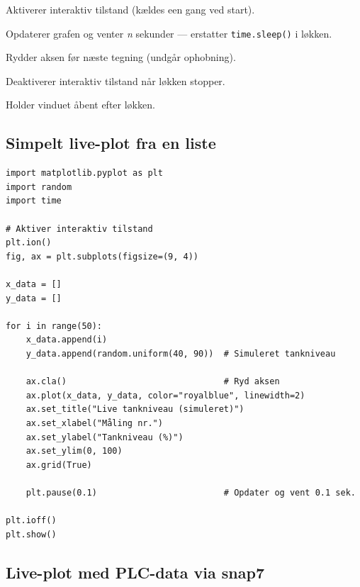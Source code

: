 \documentclass[12pt, a4paper]{article}
\begin{document}
\begin{tcolorbox}[infobox, title={\faInfoCircle\quad Hvordan virker \texttt{plt.ion()}?}]
\begin{description}[leftmargin=3.2cm, style=nextline]
  \item[\texttt{plt.ion()}]   Aktiverer interaktiv tilstand (kældes een gang ved start).
  \item[\texttt{plt.pause(n)}] Opdaterer grafen og venter \textit{n} sekunder ---
                               erstatter \texttt{time.sleep()} i løkken.
  \item[\texttt{ax.cla()}]    Rydder aksen før næste tegning (undgår ophobning).
  \item[\texttt{plt.ioff()}]  Deaktiverer interaktiv tilstand når løkken stopper.
  \item[\texttt{plt.show()}]  Holder vinduet åbent efter løkken.
\end{description}
\end{tcolorbox}

\subsection{Simpelt live-plot fra en liste}

\begin{tcolorbox}[pythonbox, title={\faPython\quad Kode 4 --- Live-plot med simulerede værdier}]
\begin{verbatim}
import matplotlib.pyplot as plt
import random
import time

# Aktiver interaktiv tilstand
plt.ion()
fig, ax = plt.subplots(figsize=(9, 4))

x_data = []
y_data = []

for i in range(50):
    x_data.append(i)
    y_data.append(random.uniform(40, 90))  # Simuleret tankniveau

    ax.cla()                               # Ryd aksen
    ax.plot(x_data, y_data, color="royalblue", linewidth=2)
    ax.set_title("Live tankniveau (simuleret)")
    ax.set_xlabel("Måling nr.")
    ax.set_ylabel("Tankniveau (%)")
    ax.set_ylim(0, 100)
    ax.grid(True)

    plt.pause(0.1)                         # Opdater og vent 0.1 sek.

plt.ioff()
plt.show()
\end{verbatim}
\end{tcolorbox}

\subsection{Live-plot med PLC-data via snap7}
\end{document}
